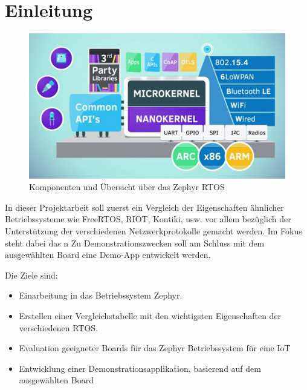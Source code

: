 \chapter{Einleitung}
\label{chap:einleitung}

\begin{figure}[h]
	\centering
	\includegraphics[width=0.7\linewidth]{bilder/zephyr_components.jpg}
	\caption{Komponenten und Übersicht über das Zephyr RTOS}
	\label{fig:components}
\end{figure}

In dieser Projektarbeit soll zuerst ein Vergleich der Eigenschaften ähnlicher
Betriebssysteme wie FreeRTOS, RIOT, Kontiki, usw. vor allem bezüglich der Unterstützung der
verschiedenen Netzwerkprotokolle gemacht werden. Im Fokus steht dabei das n
Zu Demonstrationszwecken soll am Schluss mit dem ausgewählten Board eine Demo-App entwickelt werden.

Die Ziele sind:

\begin{itemize}
	\item Einarbeitung in das Betriebssystem Zephyr.
	\item Erstellen einer Vergleichstabelle mit den wichtigsten Eigenschaften der verschiedenen
	RTOS.
	\item Evaluation geeigneter Boards für das Zephyr Betriebssystem für eine IoT
	\item Entwicklung einer Demonstrationsapplikation, basierend auf dem ausgewählten Board
\end{itemize}
